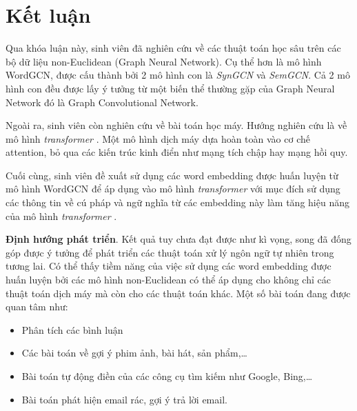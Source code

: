 \chapter{Kết luận}

Qua khóa luận này, sinh viên đã nghiên cứu về các thuật toán học sâu trên các bộ dữ liệu non-Euclidean (Graph Neural Network). Cụ thể hơn là mô hình WordGCN, được cấu thành bởi 2 mô hình con là \textit{SynGCN} và \textit{SemGCN}. Cả 2 mô hình con đều được lấy ý tưởng từ một biến thể thường gặp của Graph Neural Network đó là Graph Convolutional Network.

Ngoài ra, sinh viên còn nghiên cứu về bài toán học máy. Hướng nghiên cứu là về mô hình  \textit{transformer} . Một mô hình dịch máy dựa hoàn toàn vào cơ chế attention, bỏ qua các kiến trúc kinh điển như mạng tích chập hay mạng hồi quy.

Cuối cùng, sinh viên đề xuất sử dụng các word embedding được huấn luyện từ mô hình WordGCN để áp dụng vào mô hình  \textit{transformer}  với mục đích sử dụng các thông tin về cú pháp và ngữ nghĩa từ các embedding này làm tăng hiệu năng của mô hình  \textit{transformer} .

\textbf{Định hướng phát triển}. Kết quả tuy chưa đạt được như kì vọng, song đã đống góp được ý tưởng để phát triển các thuật toán xử lý ngôn ngữ tự nhiên trong tương lai. Có thể thấy tiềm năng của việc sử dụng các word embedding được huấn luyện bởi các mô hình non-Euclidean có thể áp dụng cho không chỉ các thuật toán dịch máy mà còn cho các thuật toán khác. Một số bài toán đang được quan tâm như: 
\begin{itemize}
	\item Phân tích các bình luận 
	\item Các bài toán về gợi ý phim ảnh, bài hát, sản phẩm,\dots
	\item Bài toán tự động điền của các công cụ tìm kiếm như Google, Bing,\dots
	\item Bài toán phát hiện email rác, gợi ý trả lời email.
\end{itemize} 